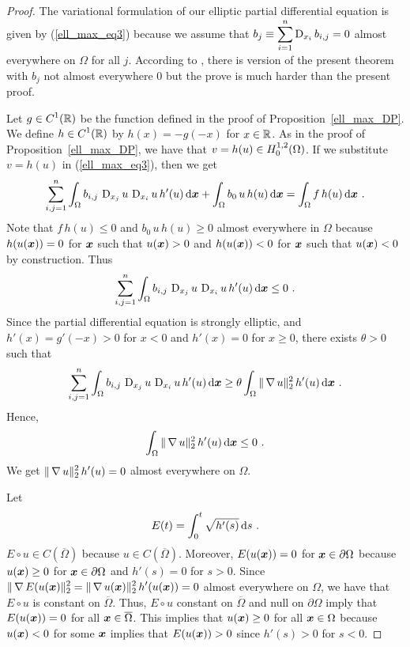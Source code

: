 \begin{proof}
The variational formulation of our elliptic partial differential
equation is given by (\ref{ell_max_eq3}) because we assume that
$\displaystyle b_j \equiv \sum_{i=1}^n \operatorname{D}_{x_i} b_{i,j} = 0$
almost everywhere on $\Omega$ for all $j$.  According to \cite{Br},
there is version of the present theorem with
$b_j$ not almost everywhere $0$ but the prove is much harder
than the present proof.

  Let $\displaystyle g\in C^1(\mathbb{R})$ be the function defined
in the proof of Proposition~\ref{ell_max_DP}.  We define
$\displaystyle h\in C^1(\mathbb{R})$ by $h(x) = -g(-x)$
for $x\in \mathbb{R}$.  As in the proof of Proposition~\ref{ell_max_DP}, we have
that $\displaystyle v=h(u) \in H^{1,2}_0(\Omega)$.  If we substitute
$v=h(u)$ in (\ref{ell_max_eq3}), then we get
\[
\sum_{i,j=1}^n
\int_\Omega b_{i,j} \, \operatorname{D}_{x_j} u \, \operatorname{D}_{x_i} u \,
h'(u) \,\mathrm{d}{{\bm{x}}} + \int_\Omega b_0 \, u \, h(u) \,\mathrm{d}{{\bm{x}}} 
= \int_\Omega f\,h(u) \,\mathrm{d}{{\bm{x}}} \ .
\]
Note that $f\,h(u) \leq 0$ and
$b_0 \, u \, h(u)\geq 0$ almost everywhere in $\Omega$ because
$h(u({\bm{x}})) = 0$ for ${\bm{x}}$ such that $u({\bm{x}})>0$ and
$h(u({\bm{x}})) < 0$ for ${\bm{x}}$ such that $u({\bm{x}}) < 0$ by
construction.  Thus
\[
\sum_{i,j=1}^n
\int_\Omega b_{i,j} \, \operatorname{D}_{x_j} u \, \operatorname{D}_{x_i} u \,
h'(u) \,\mathrm{d}{{\bm{x}}} \leq 0 \ .
\]
Since the partial differential equation is strongly elliptic, and
$h'(x) = g'(-x)>0$ for $x<0$ and $h'(x) = 0$ for $x \geq 0$, there
exists $\theta >0$ such that
\[
\sum_{i,j=1}^n
\int_\Omega b_{i,j} \, \operatorname{D}_{x_j} u \, \operatorname{D}_{x_i} u \, h'(u) \,\mathrm{d}{{\bm{x}}}
\geq \theta \int_\Omega \|\operatorname{\nabla} u\|_2^2\, h'(u) \,\mathrm{d}{{\bm{x}}} \  .
\]
Hence,
\[
\int_\Omega \|\operatorname{\nabla} u\|_2^2\, h'(u) \,\mathrm{d}{{\bm{x}}} \leq 0 \ .
\]
We get $\displaystyle \|\operatorname{\nabla} u\|_2^2\, h'(u) =0$ almost everywhere on $\Omega$.

Let
\begin{equation} \label{ell_max_thPr}
E(t) = \int_0^t \sqrt{h'(s)} \,\mathrm{d}{s} \ .
\end{equation}
$E\circ u \in C(\overline{\Omega})$ because $u\in C(\overline{\Omega})$.
Moreover, $E(u({\bm{x}})) = 0$ for ${\bm{x}} \in \partial \Omega$ because
$u({\bm{x}}) \geq 0$ for ${\bm{x}} \in \partial \Omega$ and
$h'(s)=0$ for $s>0$.  Since
$\displaystyle \|\operatorname{\nabla} E(u({\bm{x}})\|_2^2 =
\|\operatorname{\nabla} u({\bm{x}})\|_2^2\, h'(u({\bm{x}})) = 0$ almost everywhere
on $\Omega$, we have that $E\circ u$ is constant on $\overline{\Omega}$.
Thus, $E\circ u$ constant on $\overline{\Omega}$ and null on
$\partial \Omega$ imply that
$E(u({\bm{x}})) =0$ for all ${\bm{x}} \in \overline{\Omega}$.  This implies
that $u({\bm{x}}) \geq 0$ for all ${\bm{x}}\in \Omega$ because
$u({\bm{x}})<0$ for some ${\bm{x}}$ implies that
$E(u({\bm{x}})) >0$ since $h'(s) > 0$ for $s<0$.


\end{proof}
